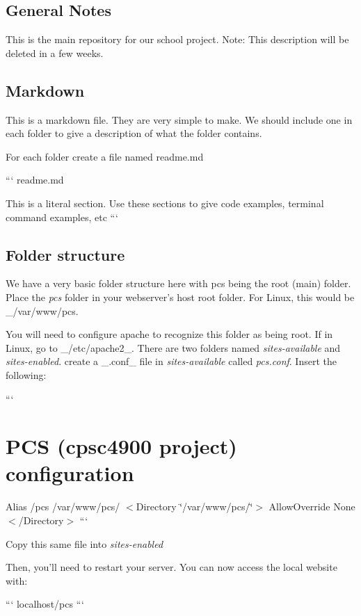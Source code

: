 \subsection*{General Notes}

This is the main repository for our school project. Note\-: This description will be deleted in a few weeks.

\subsection*{Markdown}

This is a markdown file. They are very simple to make. We should include one in each folder to give a description of what the folder contains.

For each folder create a file named readme.\-md

``` readme.\-md

This is a literal section. Use these sections to give code examples, terminal command examples, etc ```

\subsection*{Folder structure}

We have a very basic folder structure here with pcs being the root (main) folder. Place the {\itshape pcs} folder in your webserver's host root folder. For Linux, this would be \-\_\-/var/www/pcs.

You will need to configure apache to recognize this folder as being root. If in Linux, go to \-\_\-/etc/apache2\-\_\-. There are two folders named {\itshape sites-\/available} and {\itshape sites-\/enabled}. create a \-\_\-.\-conf\-\_\- file in {\itshape sites-\/available} called {\itshape pcs.\-conf}. Insert the following\-:

``` \section*{P\-C\-S (cpsc4900 project) configuration}

Alias /pcs /var/www/pcs/ $<$Directory \char`\"{}/var/www/pcs/\char`\"{}$>$ Allow\-Override None $<$/\-Directory$>$ ```

Copy this same file into {\itshape sites-\/enabled}

Then, you'll need to restart your server. You can now access the local website with\-:

``` localhost/pcs ```


